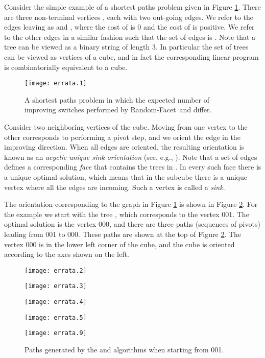 \documentclass[twoside,11pt]{article}
\newcommand{\RandomFacet}{\mbox{\sc Random-}\allowbreak\mbox{\sc Facet}}
\begin{document}
Consider the simple example of a shortest paths problem given in Figure \ref{fig:example}. There are three non-terminal vertices , each with two out-going edges. We refer to the edges leaving  as  and , where the cost of  is 0 and the cost of  is positive. We refer to the other edges in a similar fashion such that the set of edges is . Note that a tree  can be viewed as a binary string  of length 3. In particular the set of trees can be viewed as vertices of a cube, and in fact the corresponding linear program is combinatorially equivalent to a cube.

\begin{figure}[t]
\begin{center}
\texttt{[image: errata.1]}
\end{center}
\caption{A shortest paths problem in which the expected number of improving switches performed by \RandomFacet\ and  differ.}\label{fig:example}
\end{figure}

Consider two neighboring vertices of the cube. Moving from one vertex to the other corresponds to performing a pivot step, and we orient the edge in the improving direction. When all edges are oriented, the resulting orientation is known as an \emph{acyclic unique sink orientation} (see, e.g., \cite{SzWe01}). Note that a set of edges  defines a corresponding \emph{face} that contains the trees in . In every such face there is a unique optimal solution, which means that in the subcube there is a unique vertex where all the edges are incoming. Such a vertex is called a \emph{sink}.

The orientation corresponding to the graph in Figure \ref{fig:example} is shown in Figure \ref{fig:slower}. For the example we start with the tree , which corresponds to the vertex 001. The optimal solution is the vertex 000, and there are three paths (sequences of pivots) leading from 001 to 000. These paths are shown at the top of Figure \ref{fig:slower}. The vertex 000 is in the lower left corner of the cube, and the cube is oriented according to the axes shown on the left.

\begin{figure}[t]
\begin{center}
\parbox{1.2in}{
\center
\texttt{[image: errata.2]}
}
\hspace*{5pt}
\parbox{1.5in}{
\center
\texttt{[image: errata.3]}
}
\hspace*{5pt}
\parbox{1.5in}{
\center
\texttt{[image: errata.4]}
}
\hspace*{5pt}
\parbox{1.5in}{
\center
\texttt{[image: errata.5]}
}

\vspace*{5pt}

\parbox{6in}{
\center
\texttt{[image: errata.9]}
\caption{Paths generated by the  and  algorithms when starting from 001.}\label{fig:slower}
}
\end{center}
\end{figure}
\end{document}
